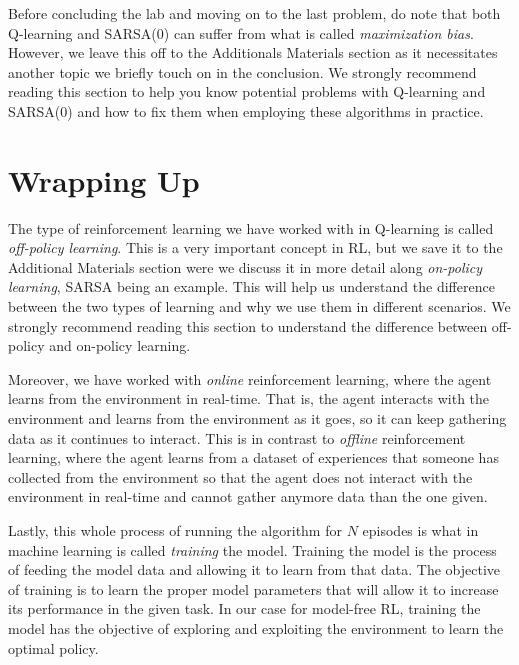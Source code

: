 Before concluding the lab and moving on to the last problem, do note that both Q-learning and SARSA(0) can suffer from what is called \emph{maximization bias}.
However, we leave this off to the Additionals Materials section as it necessitates another topic we briefly touch on in the conclusion.
We strongly recommend reading this section to help you know potential problems with Q-learning and SARSA(0) and how to fix them when employing these algorithms in practice.

\section*{Wrapping Up}
The type of reinforcement learning we have worked with in Q-learning is called \emph{off-policy learning}.
This is a very important concept in RL, but we save it to the Additional Materials section were we discuss it in more detail along \emph{on-policy learning}, SARSA being an example.
This will help us understand the difference between the two types of learning and why we use them in different scenarios.
We strongly recommend reading this section to understand the difference between off-policy and on-policy learning.

Moreover, we have worked with \emph{online} reinforcement learning, where the agent learns from the environment in real-time.
That is, the agent interacts with the environment and learns from the environment as it goes, so it can keep gathering data as it continues to interact.
This is in contrast to \emph{offline} reinforcement learning, where the agent learns from a dataset of experiences that someone has collected from the environment so that the agent does not interact with the environment in real-time and cannot gather anymore data than the one given.

Lastly, this whole process of running the algorithm for $N$ episodes is what in machine learning is called \emph{training} the model.
Training the model is the process of feeding the model data and allowing it to learn from that data.
The objective of training is to learn the proper model parameters that will allow it to increase its performance in the given task.
In our case for model-free RL, training the model has the objective of exploring and exploiting the environment to learn the optimal policy.

